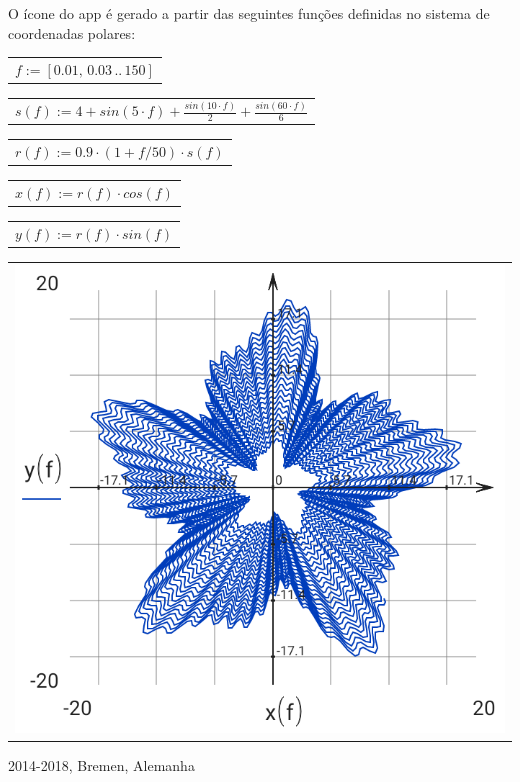 \documentclass[DIV=calc, paper=a4, fontsize=11pt, twocolumn]{scrartcl}
\begin{document}
O ícone do app é gerado a partir das
seguintes funções definidas no sistema
de coordenadas polares:
\begin{center}\begin{tabular}{c}
                $f := \left[ 0.01,\, 0.03 \,..\, 150 \right]$
\end{tabular}\end{center}
\begin{center}\begin{tabular}{c}
                $s(f) := 4 + sin \left( 5 \cdot f\right)  + \frac{sin \left( 10 \cdot f\right) }{2} + \frac{sin \left( 60 \cdot f\right) }{6}$
\end{tabular}\end{center}
\begin{center}\begin{tabular}{c}
                $r(f) := 0.9 \cdot \left( 1 + f / 50 \right) \cdot s \left( f\right) $
\end{tabular}\end{center}
\begin{center}\begin{tabular}{c}
                $x(f) := r \left( f\right)  \cdot cos \left( f\right) $
\end{tabular}\end{center}
\begin{center}\begin{tabular}{c}
                $y(f) := r \left( f\right)  \cdot sin \left( f\right) $
\end{tabular}\end{center}
\begin{center}\begin{tabular}{c} \includegraphics[resolution=320]{graphics/about_micromath_fig1.png} \end{tabular}\end{center}

2014-2018, Bremen, Alemanha
\end{document}
